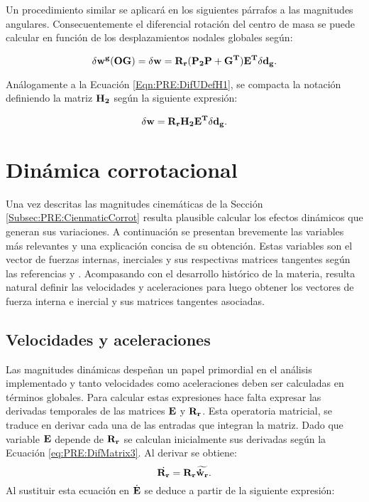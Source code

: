  Un procedimiento similar se aplicará en los siguientes párrafos a las magnitudes angulares. Consecuentemente el diferencial rotación del centro de masa se puede calcular en función de los desplazamientos nodales globales según:

 \begin{equation}\label{Eqn:PRE:AngularBaricentro}
 	\delta \bf{w^g} (OG) =\delta \bf{w} =\bf{R}_r (\bf{P}_2\bf{P}+\bf{G}^T)\bf{E}^T\delta \bf{d}_g .
 \end{equation}

Análogamente a la Ecuación \eqref{Eqn:PRE:DifUDefH1}, se compacta la notación definiendo la matriz $\bf{H}_2$ según la siguiente expresión:

\begin{equation}
	\delta \bf{w}= \bf{R}_r\bf{H}_2\bf{E}^T \delta \bf{d}_g.
\end{equation}




\section{Dinámica corrotacional}\label{Subsec:PRE:DinamicCorrot}

Una vez descritas las magnitudes cinemáticas de la Sección \ref{Subsec:PRE:CienmaticCorrot} resulta plausible calcular los efectos dinámicos que generan sus variaciones. A continuación se presentan brevemente las variables más relevantes y una explicación concisa de su obtención. Estas
variables son el vector de fuerzas internas, inerciales y sus respectivas matrices tangentes según las referencias  \citep{Le2014} y \citep{Battini2002}. Acompasando con el desarrollo histórico de la materia, resulta natural definir las velocidades y aceleraciones para luego obtener los vectores de fuerza interna e inercial y sus matrices tangentes asociadas. 

\subsection{Velocidades y aceleraciones}\label{Sec:PRE:VelAc}

Las magnitudes dinámicas despeñan un papel primordial en el análisis implementado y tanto velocidades como aceleraciones deben ser calculadas en términos globales. Para calcular estas expresiones hace falta expresar las derivadas temporales de las matrices $\bf{E}$ y $\bf{R}_r$. Esta operatoria matricial, se traduce en derivar cada una de las entradas que integran la matriz. Dado que variable $\bf{E}$ depende de $\bf{R}_r$ se calculan inicialmente sus derivadas según la Ecuación \eqref{eq:PRE:DifMatrix3}. Al derivar se obtiene: 
\begin{equation}
\dot{\bf{R}_r} = \bf{R_r}\widetilde{\dot{\bf{w}}_r}.
\end{equation}
 Al sustituir esta ecuación en $\dot{\bf{E}}$ se deduce a partir de la siguiente expresión:

